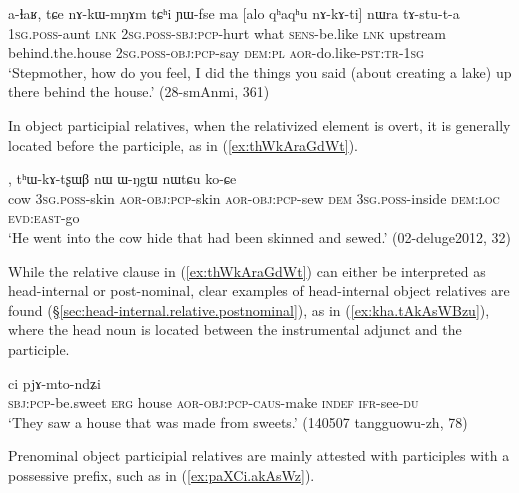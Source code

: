 \begin{exe}
\ex \label{ex:nAkAti.nWra}
\gll a-ɬaʁ, tɕe nɤ-kɯ-mŋɤm tɕʰi ɲɯ-fse ma [alo qʰaqʰu nɤ-kɤ-ti] nɯra tɤ-stu-t-a \\
\textsc{1sg}.\textsc{poss}-aunt \textsc{lnk} \textsc{2sg}.\textsc{poss}-\textsc{sbj}:\textsc{pcp}-hurt what \textsc{sens}-be.like \textsc{lnk} upstream behind.the.house \textsc{2sg}.\textsc{poss}-\textsc{obj}:\textsc{pcp}-say \textsc{dem}:\textsc{pl} \textsc{aor}-do.like-\textsc{pst}:\textsc{tr}-\textsc{1sg} \\
\glt `Stepmother, how do you feel, I did the things you said (about creating a lake) up there behind the house.' (28-smAnmi, 361)
\end{exe}


In object participial relatives, when the relativized element is overt, it is generally located before the participle, as in (\ref{ex:thWkAraGdWt}). 

\begin{exe}
\ex \label{ex:thWkAraGdWt}
, tʰɯ-kɤ-tʂɯβ nɯ ɯ-ŋgɯ nɯtɕu ko-ɕe  \\
cow \textsc{3sg}.\textsc{poss}-skin \textsc{aor}-\textsc{obj}:\textsc{pcp}-skin \textsc{aor}-\textsc{obj}:\textsc{pcp}-sew \textsc{dem} \textsc{3sg}.\textsc{poss}-inside \textsc{dem}:\textsc{loc} \textsc{evd}:\textsc{east}-go \\
\glt  `He went into the cow hide that had been skinned and sewed.'    (02-deluge2012, 32)
\end{exe}  

While the relative clause in (\ref{ex:thWkAraGdWt}) can either be interpreted as head-internal or post-nominal, clear examples of head-internal object relatives are found (§\ref{sec:head-internal.relative.postnominal}), as in (\ref{ex:kha.tAkAsWBzu}), where the head noun  is located between the instrumental adjunct  and the participle.
 
\begin{exe}
\ex \label{ex:kha.tAkAsWBzu}
 ci pjɤ-mto-ndʑi\\
\textsc{sbj}:\textsc{pcp}-be.sweet \textsc{erg} house \textsc{aor}-\textsc{obj}:\textsc{pcp}-\textsc{caus}-make \textsc{indef} \textsc{ifr}-see-\textsc{du}\\
\glt `They saw a house that was made from sweets.' (140507 tangguowu-zh, 78)
\end{exe}

Prenominal object participial relatives are mainly attested with participles with a possessive prefix, such as  in (\ref{ex:paXCi.akAsWz}). 

